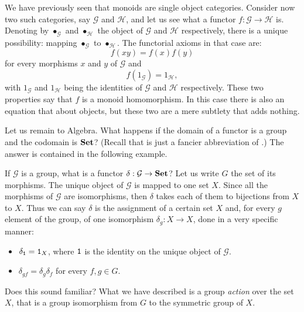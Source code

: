 \begin{example}
  We have previously seen that monoids are single object
  categories. Consider now two such categories, say \(\mathcal{G}\) and
  \(\mathcal{H}\), and let us see what a functor \(f : \mathcal{G} \to \mathcal{H}\)
  is. Denoting by \(\bullet_{\mathcal{G}}\) and \(\bullet_{\mathcal{H}}\) the object of
  \(\mathcal{G}\) and \(\mathcal{H}\) respectively, there is a unique possibility:
  mapping \(\bullet_{\mathcal{G}}\) to \(\bullet_{\mathcal{H}}\). The functorial axioms in
  that case are:
  \[
    f(xy) = f(x)f(y)
  \]
  for every morphisms \(x\) and \(y\) of \(\mathcal{G}\) and
  \[
    f(1_{\mathcal{G}}) = 1_{\mathcal{H}} ,
  \]
  with \(1_{\mathcal{G}}\) and \(1_{\mathcal{H}}\) being the identities of
  \(\mathcal{G}\) and \(\mathcal{H}\) respectively. These two properties say that
  \(f\) is a monoid homomorphism. In this case there is also an equation
  that about objects, but these two are a mere subtlety that adds
  nothing.
\end{example}

Let us remain to Algebra. What happens if the domain of a functor is a
group and the codomain is \(\mathbf{Set}\)? (Recall that  is just a
fancier abbreviation of .) The answer is
contained in the following example.

\begin{example}
  If \(\mathcal{G}\) is a group, what is a functor
  \(\delta : \mathcal{G} \to \mathbf{Set}\)? Let us write \(G\) the set of its
  morphisms. The unique object of \(\mathcal{G}\) is mapped to one set
  \(X\). Since all the morphisms of \(\mathcal{G}\) are isomorphisms, then
  \(\delta\) takes each of them to bijections from \(X\) to \(X\). Thus we
  can say \(\delta\) is the assignment of a certain set \(X\) and, for every
  \(g\) element of the group, of one isomorphism \(\delta_g : X \to X\), done
  in a very specific manner:
  \begin{itemize}
  \item \(\delta_{\mathtt 1} = \mathtt 1_X\), where \(\mathtt 1\) is the identity on the unique
    object of \(\mathcal{G}\).
  \item \(\delta_{gf} = \delta_g \delta_f\) for every \(f, g \in G\).
  \end{itemize}
  Does this sound familiar? What we have described is a group {\em
    action} over the set \(X\), that is a group isomorphism from \(G\)
  to the symmetric group of \(X\).
\end{example}

